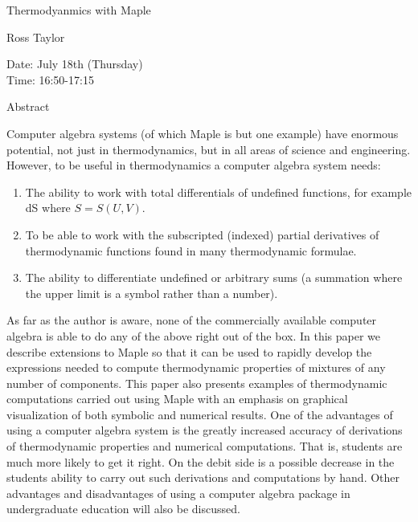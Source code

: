 \begin{center}
\LARGE
Thermodyanmics with Maple


\end{center}

\begin{center}
\Large
Ross Taylor
\end{center}

\noindent
Date:  July 18th (Thursday)\\
Time:  16:50-17:15\\

\begin{center}
\large
Abstract
\end{center}

Computer algebra systems (of which Maple is but one example) have enormous potential, not just
in thermodynamics, but in all areas of science and engineering. However, to be useful in
thermodynamics a computer algebra system needs: 

\begin{enumerate}

\item
The ability to work with total differentials of undefined functions, for example dS where
    $S=S(U,V)$.
\item
To be able to work with the subscripted (indexed) partial derivatives of thermodynamic
    functions found in many thermodynamic formulae.
\item
The ability to differentiate undefined or arbitrary sums (a summation where the upper limit
    is a symbol rather than a number). 

\end{enumerate}
As far as the author is aware, none of the commercially available computer algebra is able to do
any of the above right out of the box. In this paper we describe extensions to Maple so that it can
be used to rapidly develop the expressions needed to compute thermodynamic properties of
mixtures of any number of components. This paper also presents examples of thermodynamic
computations carried out using Maple with an emphasis on graphical visualization of both
symbolic and numerical results. One of the advantages of using a computer algebra system is the
greatly increased accuracy of derivations of thermodynamic properties and numerical
computations. That is, students are much more likely to get it right. On the debit side is a possible
decrease in the students ability to carry out such derivations and computations by hand. Other
advantages and disadvantages of using a computer algebra package in undergraduate education will
also be discussed. 

